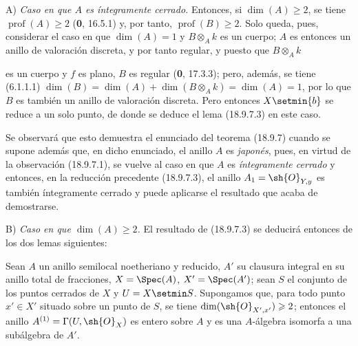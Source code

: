 A) \emph{Caso en que $A$ es íntegramente cerrado.} Entonces, si $\dim(A)\geq 2$, se tiene $\operatorname{prof}(A)\geq 2$ (\textbf 0, 16.5.1) y, por tanto, $\operatorname{prof}(B)\geq 2$. Solo queda, pues, considerar el caso en que $\dim(A)=1$ y $B\otimes_A k$ es un cuerpo; $A$ es entonces un anillo de valoración discreta, y por tanto regular, y puesto que $B\otimes_A k$


es un cuerpo y $f$ es plano, $B$ es regular (\textbf 0, 17.3.3); pero, además, se tiene (6.1.1.1) $\dim(B)=\dim(A)+\dim(B\otimes_A k)=\dim(A)=1$, por lo que $B$ es también un anillo de valoración discreta. Pero entonces $X\setmin\{b\}$ se reduce a un solo punto, de donde se deduce el lema (18.9.7.3) en este caso.

Se observará que esto demuestra el enunciado del teorema (18.9.7) cuando se supone además que, en dicho enunciado, el anillo $A$ es \emph{japonés}, pues, en virtud de la observación (18.9.7.1), se vuelve al caso en que $A$ es \emph{íntegramente cerrado} y entonces, en la reducción precedente (18.9.7.3), el anillo $A_1=\sh{O}_{Y,y}$ es también íntegramente cerrado y puede aplicarse el resultado que acaba de demostrarse.

B) \emph{Caso en que $\dim(A)\geq 2$.} El resultado de (18.9.7.3) se deducirá entonces de los dos lemas siguientes:

\begin{lemma}[18.9.7.5]
\label{IV.18.9.7.5}
Sean $A$ un anillo semilocal noetheriano y reducido, $A'$ su clausura integral en su anillo total de fracciones, $X=\Spec(A)$, $X'=\Spec(A')$; sean $S$ el conjunto de los puntos cerrados de $X$ y $U=X\setmin S$. Supongamos que, para todo punto $x'\in X'$ situado sobre un punto de $S$, se tiene $\dim(\sh{O}_{X',x'})\geq 2$; entonces el anillo $A^{(1)}=\Gamma(U,\sh{O}_X)$ es entero sobre $A$ y es una $A$-álgebra isomorfa a una subálgebra de $A'$.
\end{lemma}


